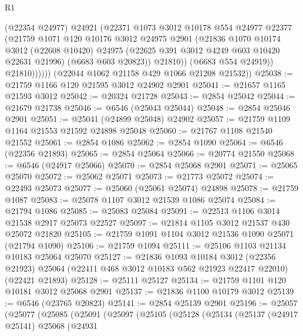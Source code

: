 \begin{lexlean}{R1}
\begin{coremodule}
                    (@22354 @24977)
                    @24921
                    (@22371
                      @1073
                      @3012
                      @10178
                      @554
                      @24977
                      @22377
                      (@21759
                        @1071
                        @120
                        @10176
                        @3012
                        @24975
                        @2901
                        (@21836
                          @1070
                          @10174
                          @3012
                          (@22608 @10420)
                          @24975
                          (@22625 @391 @3012 @4249 @603 @10420 @22631 @21996)
                          (@6683 @603 @20823))
                        @21810))
                    (@6683 @554 @24919))
                  @21810))))))
      (@22044 @1062 @21158 @429 @1066 @21208 @21532))
@25038 := @21759 @1166 @120 @21595 @3012 @24902 @2901
@25041 := @21657 @1165 @21593 @3012
@25042 := @20324 @21728
@25043 := @2854 @25042
@25044 := @21679 @21738
@25046 := @6546 (@25043 @25044)
@25048 := @2854 @25046 @2901
@25051 := @25041 (@24899 @25048) @24902
@25057 := @21759 @1109 @1164 @21553 @21592 @24898 @25048
@25060 := @21767 @1108 @21540 @21552
@25061 := @2854 @1086
@25062 := @2854 @1090
@25064 := @6546 (@22356 @21893)
@25065 := @2854 @25064
@25066 := @20774 @21550
@25068 := @6546 (@24917 @25066)
@25070 := @2854 @25068 @2901
@25071 := @25065 @25070
@25072 := @25062 @25071
@25073 := @21773 @25072
@25074 := @22493 @25073
@25077 := @25060 (@25061 @25074) @24898
@25078 := @21759 @1087
@25083 := @25078 @1107 @3012 @21539 @1086 @25074
@25084 := @21794 @1086
@25085 := @25083 @25084
@25091 := @22513 @1106 @3014 @21538 @2917 @25073 @22527
@25097 := @21814 @1105 @3012 @21537 @430 @25072 @21820
@25105 := @21759 @1091 @1104 @3012 @21536 @1090 @25071 (@21794 @1090)
@25106 := @21759 @1094
@25111 := @25106 @1103 @21134 @10183 @25064 @25070
@25127 := @21836
    @1093
    @10184
    @3012
    (@22356 @21923)
    @25064
    (@22411 @468 @3012 @10183 @562 @21923 @22417 @22010)
    (@22421 @21893)
@25128 := @25111 @25127
@25134 := @21759 @1101 @120 @10181 @3012 @25068 @2901
@25137 := @21836 @1100 @10179 @3012
@25139 := @6546 (@23765 @20823)
@25141 := @2854 @25139 @2901
@25196 := @25057
    (@25077
      (@25085
        (@25091
          (@25097
            (@25105
              (@25128
                (@25134
                  (@25137
                    (@24917 @25141)
                    @25068
                    (@24931

\end{coremodule}
\end{lexlean}
